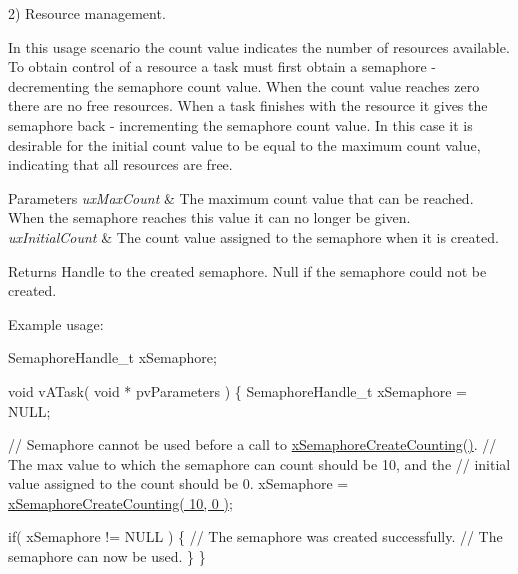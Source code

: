 2) Resource management.

In this usage scenario the count value indicates the number of resources available. To obtain control of a resource a task must first obtain a semaphore -\/ decrementing the semaphore count value. When the count value reaches zero there are no free resources. When a task finishes with the resource it \textquotesingle{}gives\textquotesingle{} the semaphore back -\/ incrementing the semaphore count value. In this case it is desirable for the initial count value to be equal to the maximum count value, indicating that all resources are free.


\begin{DoxyParams}{Parameters}
{\em ux\+Max\+Count} & The maximum count value that can be reached. When the semaphore reaches this value it can no longer be \textquotesingle{}given\textquotesingle{}.\\
\hline
{\em ux\+Initial\+Count} & The count value assigned to the semaphore when it is created.\\
\hline
\end{DoxyParams}
\begin{DoxyReturn}{Returns}
Handle to the created semaphore. Null if the semaphore could not be created.
\end{DoxyReturn}
Example usage\+: 
\begin{DoxyPre}
SemaphoreHandle\_t xSemaphore;\end{DoxyPre}



\begin{DoxyPre}void vATask( void * pvParameters )
\{
SemaphoreHandle\_t xSemaphore = NULL;\end{DoxyPre}



\begin{DoxyPre} // Semaphore cannot be used before a call to \hyperlink{vendor_2ceedling_2plugins_2freertos_2src_2freertos_2include_2semphr_8h_a7764616a918a46115403569a88148ad4}{xSemaphoreCreateCounting()}.
 // The max value to which the semaphore can count should be 10, and the
 // initial value assigned to the count should be 0.
 xSemaphore = \hyperlink{vendor_2ceedling_2plugins_2freertos_2src_2freertos_2include_2semphr_8h_a7764616a918a46115403569a88148ad4}{xSemaphoreCreateCounting( 10, 0 )};\end{DoxyPre}



\begin{DoxyPre} if( xSemaphore != NULL )
 \{
     // The semaphore was created successfully.
     // The semaphore can now be used.
 \}
\}
\end{DoxyPre}



